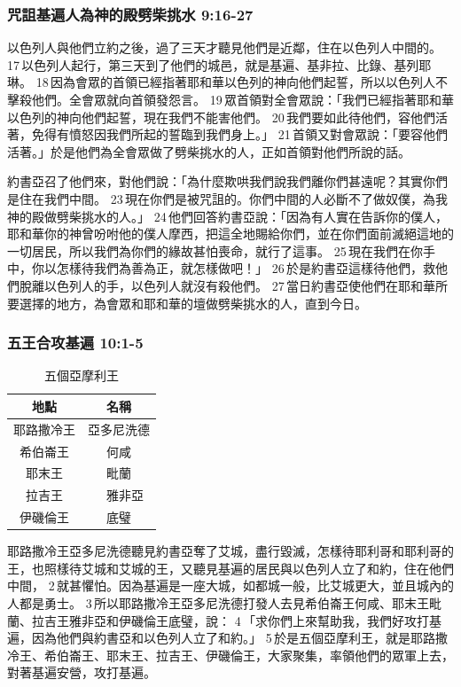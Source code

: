 \subsubsection{咒詛基遍人為神的殿劈柴挑水 9:16-27}
以色列人與他們立約之後，過了三天才聽見他們是近鄰，住在以色列人中間的。 17 以色列人起行，第三天到了他們的城邑，就是基遍、基非拉、比錄、基列耶琳。 18 因為會眾的首領已經指著耶和華以色列的神向他們起誓，所以以色列人不擊殺他們。全會眾就向首領發怨言。 19 眾首領對全會眾說：「我們已經指著耶和華以色列的神向他們起誓，現在我們不能害他們。 20 我們要如此待他們，容他們活著，免得有憤怒因我們所起的誓臨到我們身上。」 21 首領又對會眾說：「要容他們活著。」於是他們為全會眾做了劈柴挑水的人，正如首領對他們所說的話。

約書亞召了他們來，對他們說：「為什麼欺哄我們說我們離你們甚遠呢？其實你們是住在我們中間。 23 現在你們是被咒詛的。你們中間的人必斷不了做奴僕，為我神的殿做劈柴挑水的人。」 24 他們回答約書亞說：「因為有人實在告訴你的僕人，耶和華你的神曾吩咐他的僕人摩西，把這全地賜給你們，並在你們面前滅絕這地的一切居民，所以我們為你們的緣故甚怕喪命，就行了這事。 25 現在我們在你手中，你以怎樣待我們為善為正，就怎樣做吧！」 26 於是約書亞這樣待他們，救他們脫離以色列人的手，以色列人就沒有殺他們。 27 當日約書亞使他們在耶和華所要選擇的地方，為會眾和耶和華的壇做劈柴挑水的人，直到今日。

\subsubsection{五王合攻基遍 10:1-5}
\begin{table}
\centering
\begin{tabular}{|c|c|}
\hline
\hline
地點 & 名稱   \\\hline
耶路撒冷王 & 亞多尼洗德   \\\hline
希伯崙王&何咸  \\\hline
耶末王&毗蘭  \\\hline
拉吉王&　雅非亞　\\\hline
伊磯倫王&底璧　\\\hline
\end{tabular}
\caption{五個亞摩利王}
\end{table}
耶路撒冷王亞多尼洗德聽見約書亞奪了艾城，盡行毀滅，怎樣待耶利哥和耶利哥的王，也照樣待艾城和艾城的王，又聽見基遍的居民與以色列人立了和約，住在他們中間， 2 就甚懼怕。因為基遍是一座大城，如都城一般，比艾城更大，並且城內的人都是勇士。 3 所以耶路撒冷王亞多尼洗德打發人去見希伯崙王何咸、耶末王毗蘭、拉吉王雅非亞和伊磯倫王底璧，說： 4 「求你們上來幫助我，我們好攻打基遍，因為他們與約書亞和以色列人立了和約。」 5 於是五個亞摩利王，就是耶路撒冷王、希伯崙王、耶末王、拉吉王、伊磯倫王，大家聚集，率領他們的眾軍上去，對著基遍安營，攻打基遍。

